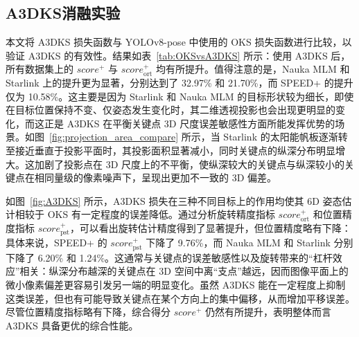 \subsection{A3DKS消融实验} \label{A3DKS_Ablation_subsection}

本文将 A3DKS 损失函数与 YOLOv8-pose 中使用的 OKS 损失函数进行比较，以验证 A3DKS 的有效性。结果如表~\ref{tab:OKSvsA3DKS} 所示：使用 A3DKS 后，所有数据集上的 $score^+$ 与 $score_{\text{ort}}^+$ 均有所提升。值得注意的是，Nauka MLM 和 Starlink 上的提升更为显著，分别达到了 32.97\% 和 21.70\%，而 SPEED+ 的提升仅为 10.58\%。这主要是因为 Starlink 和 Nauka MLM 的目标形状较为细长，即使在目标位置保持不变、仅姿态发生变化时，其二维透视投影也会出现更明显的变化，而这正是 A3DKS 在平衡关键点 3D 尺度误差敏感性方面所能发挥优势的场景。如图~\ref{fig:projection_area_compare} 所示，当 Starlink 的太阳能帆板逐渐转至接近垂直于投影平面时，其投影面积显著减小，同时关键点的纵深分布明显增大。这加剧了投影点在 3D 尺度上的不平衡，使纵深较大的关键点与纵深较小的关键点在相同量级的像素噪声下，呈现出更加不一致的 3D 偏差。

如图~\ref{fig:A3DKS} 所示，A3DKS 损失在三种不同目标上的作用均使其 6D 姿态估计相较于 OKS 有一定程度的误差降低。通过分析旋转精度指标 $score_{\text{ort}}^+$ 和位置精度指标 $score_{\text{pst}}^+$，可以看出旋转估计精度得到了显著提升，但位置精度略有下降：具体来说，SPEED+ 的 $score_{\text{pst}}^+$ 下降了 9.76\%，而 Nauka MLM 和 Starlink 分别下降了 6.20\% 和 1.24\%。这通常与关键点的误差敏感性以及旋转带来的“杠杆效应”相关：纵深分布越深的关键点在 3D 空间中离“支点”越远，因而图像平面上的微小像素偏差更容易引发另一端的明显变化。虽然 A3DKS 能在一定程度上抑制这类误差，但也有可能导致关键点在某个方向上的集中偏移，从而增加平移误差。尽管位置精度指标略有下降，综合得分 $score^+$ 仍然有所提升，表明整体而言 A3DKS 具备更优的综合性能。



\begin{table*}[htbp] 
	\centering
	\caption{损失函数消融实验}
	\label{tab:OKSvsA3DKS}
	{%
	}
\end{table*}




